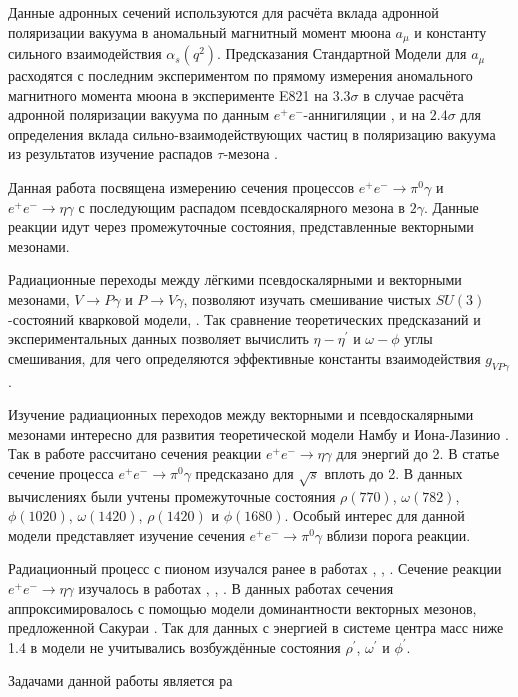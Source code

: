 Данные адронных сечений используются для расчёта вклада адронной поляризации вакуума в аномальный магнитный момент мюона $a_\mu$ и константу сильного взаимодействия $\alpha_s(q^2)$.
Предсказания Стандартной Модели для $a_\mu$ расходятся с последним экспериментом по прямому измерения аномального магнитного момента мюона в эксперименте E821 \cite{Bennett:2006fi} на $3.3 \sigma$ в случае расчёта адронной поляризации вакуума по данным $e^+e^-$-аннигиляции \cite{Hagiwara:2011af},
и на $2.4 \sigma$ для определения вклада сильно-взаимодействующих частиц в поляризацию вакуума из результатов изучение распадов $\tau$-мезона \cite{Davier:2010nc}.



Данная работа посвящена измерению сечения процессов $e^+e^- \to \pi^0 \gamma$ и $e^+e^- \to \eta \gamma$ с последующим распадом псевдоскалярного мезона в $2\gamma$.
Данные реакции идут через промежуточные состояния, представленные векторными мезонами.

Радиационные переходы между лёгкими псевдоскалярными и векторными мезонами,
$V \to P\gamma$ и $P\to V \gamma$, 
позволяют изучать смешивание чистых $SU(3)$-состояний кварковой модели, \cite{Feldmann2000}.
Так сравнение теоретических предсказаний и экспериментальных данных позволяет вычислить $\eta - \eta^\prime$ и $\omega - \phi$ углы смешивания, 
для чего определяются эффективные константы взаимодействия $g_{VP\gamma}$.

Изучение радиационных переходов между векторными и псевдоскалярными мезонами интересно для развития теоретической модели Намбу и Иона-Лазинио \cite{Nambu:1961tp}.
Так в работе \cite{Ahmadov2013} рассчитано сечения реакции $e^+e^- \to \eta \gamma$ для энергий до \SI{2}{\GeVr}.
В статье \cite{Arbuzov2011} сечение процесса $e^+e^- \to \pi^0 \gamma$ предсказано для $\sqrt{s}$ вплоть до \SI{2}{\GeVr}.
В данных вычислениях были учтены промежуточные состояния $\rho(770)$, $\omega(782)$, $\phi(1020)$, $\omega(1420)$, $\rho(1420)$ и $\phi(1680)$.
Особый интерес для данной модели представляет изучение сечения $e^+e^- \to \pi^0 \gamma$ вблизи порога реакции.

Радиационный процесс с пионом изучался ранее в работах \cite{CMD2CollaborationPhys.Lett.B605:26-362005}, \cite{Achasov2004}, \cite{Achasov2000a}.
Сечение реакции $e^+e^- \to \eta \gamma$ изучалось в работах \cite{CMD2CollaborationPhys.Lett.B605:26-362005}, \cite{Achasov2013b}, \cite{Achasov2000a}.
В данных работах сечения аппроксимировалось с помощью модели доминантности векторных мезонов, предложенной Сакураи \cite{Sakurai:1960ju}.
Так для данных с энергией в системе центра масс ниже \SI{1.4}{\GeVr} в модели не учитывались возбуждённые состояния $\rho^\prime$, $\omega^\prime$ и $\phi^\prime$.

Задачами данной работы является ра